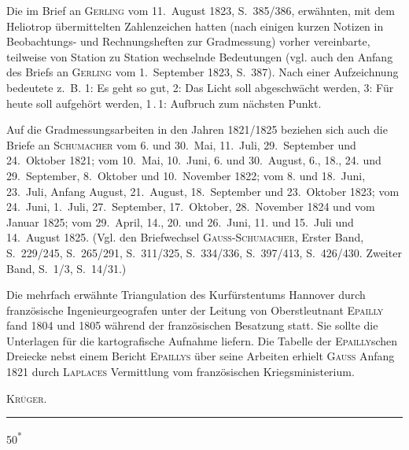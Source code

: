 \par\noindent\hspace*{\parindent}Die im Brief an \textsc{Gerling} vom 11.~August 1823, S.~385/386, erwähnten, mit dem Heliotrop übermittelten Zahlenzeichen hatten (nach einigen kurzen Notizen in Beobachtungs- und Rechnungsheften zur Gradmessung) vorher vereinbarte, teilweise von Station zu Station wechselnde Bedeutungen (vgl. auch den Anfang des Briefs an \textsc{Gerling} vom 1.~September 1823, S.~387). Nach einer Aufzeichnung bedeutete z.~B. 1: Es geht so gut, 2: Das Licht soll abgeschwächt werden, 3: Für heute soll aufgehört werden, 1\,.\,1: Aufbruch zum nächsten Punkt.
\par\noindent\hspace*{\parindent}Auf die Gradmessungsarbeiten in den Jahren 1821/1825 beziehen sich auch die Briefe an \textsc{Schumacher} vom 6. und 30.~Mai, 11.~Juli, 29.~September und 24.~Oktober 1821; vom 10.~Mai, 10.~Juni, 6. und 30.~August, 6., 18., 24. und 29.~September, 8.~Oktober und 10.~November 1822; vom 8. und 18.~Juni, 23.~Juli, Anfang August, 21.~August, 18.~September und 23.~Oktober 1823; vom 24.~Juni, 1.~Juli, 27.~September, 17.~Oktober, 28.~November 1824 und vom Januar 1825; vom 29.~April, 14., 20. und 26.~Juni, 11. und 15.~Juli und 14.~August 1825. (Vgl. den Briefwechsel \textsc{Gauss-Schumacher}, Erster Band, S.~229/245, S.~265/291, S.~311/325, S.~334/336, S.~397/413, S.~426/430. Zweiter Band, S.~1/3, S.~14/31.)
\par\noindent\hspace*{\parindent}Die mehrfach erwähnte Triangulation des Kurfürstentums Hannover durch französische Ingenieurgeografen unter der Leitung von Oberstleutnant \textsc{Epailly} fand 1804 und 1805 während der französischen Besatzung statt. Sie sollte die Unterlagen für die kartografische Aufnahme liefern. Die Tabelle der \textsc{Epailly}schen Dreiecke nebst einem Bericht \textsc{Epaillys} über seine Arbeiten erhielt \textsc{Gauss} Anfang 1821 durch \textsc{Laplaces} Vermittlung vom französischen Kriegsministerium.
\par\noindent\hfill\textsc{Krüger}.\par
\endgroup
\begin{center}\rule{.12\linewidth}{.4pt}\end{center}
\vfill\noindent\hfill 50\textsuperscript{*}\hspace*{1.5em}\par

